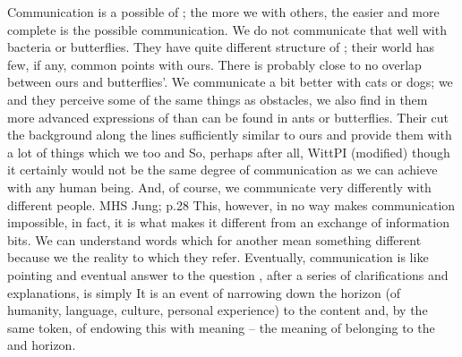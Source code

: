 Communication is a possible   of ; the
more we  with others, the easier and more complete is the possible
communication.  We do not communicate that well with bacteria or butterflies.
They have quite different structure of ; their world has few, if
any, common points with ours.  There is probably close to no overlap between
ours and butterflies'.  We communicate a bit better with cats or dogs; we and
they perceive some of the same things as obstacles, we also find in them more
advanced expressions of  than can be found in ants or butterflies.
Their  {cut} the background along the lines sufficiently
similar to ours and provide them with a lot of things which we too
 and  So, perhaps after all, \citet{if a lion
  could speak, we might understand him,}{WittPI}{ (modified)} though it
certainly would not be the same degree of communication as we can achieve with
any human being. And, of course, we communicate very differently with different
people.  \citet{Each word means something slightly different to each person,
  even among those who share the same cultural background.}{MHS}{ Jung; p.28}
This, however, in no way makes communication impossible, in fact, it is what
makes it different from an exchange of information bits.  We can understand
words which for another mean something different because we  the
reality to which they refer. Eventually, communication is like pointing and
eventual answer to the question , after a series of
clarifications and explanations, is simply  It is an event of narrowing down the  horizon
(of humanity, language, culture, personal experience) to the  content and, by
the same token, of endowing this  with meaning -- the meaning of
belonging to the  and  horizon.

